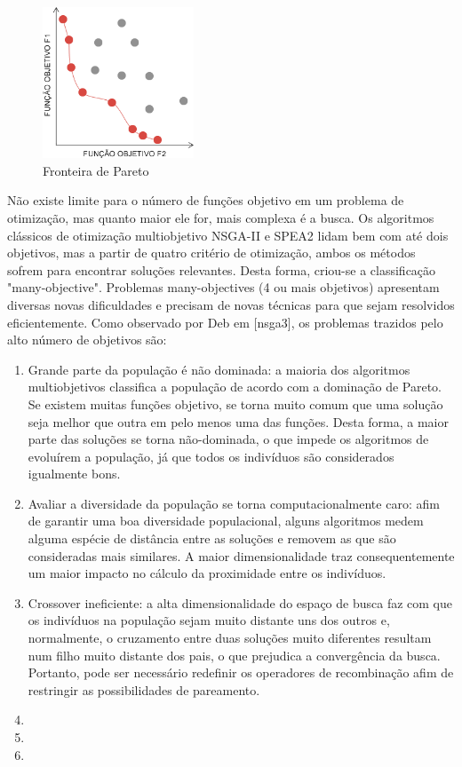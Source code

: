 \begin{figure}
	\label{fig_pareto}
	\caption{Fronteira de Pareto}
	\centering
	\includegraphics[width=0.4\textwidth]{cap_otimizacao-multi/figs/pareto}
\end{figure}

Não existe limite para o número de funções objetivo em um problema de otimização, mas quanto maior ele for, mais complexa é a busca. Os algoritmos clássicos de otimização multiobjetivo NSGA-II e SPEA2 lidam bem com até dois objetivos, mas a partir de quatro critério de otimização, ambos os métodos sofrem para encontrar soluções relevantes. Desta forma, criou-se a classificação "many-objective". Problemas many-objectives (4 ou mais objetivos) apresentam diversas novas dificuldades e precisam de novas técnicas para que sejam resolvidos eficientemente. Como observado por Deb em [nsga3], os problemas trazidos pelo alto número de objetivos são:

\begin{enumerate}  
	\item Grande parte da população é não dominada: a maioria dos algoritmos multiobjetivos classifica a população de acordo com a dominação de Pareto. Se existem muitas funções objetivo, se torna muito comum que uma solução seja melhor que outra em pelo menos uma das funções. Desta forma, a maior parte das soluções se torna não-dominada, o que impede os algoritmos de evoluírem a população, já que todos os indivíduos são considerados igualmente bons.
	\item Avaliar a diversidade da população se torna computacionalmente caro: afim de garantir uma boa diversidade populacional, alguns algoritmos medem alguma espécie de distância entre as soluções e removem as que são consideradas mais similares. A maior dimensionalidade traz consequentemente um maior impacto no cálculo da proximidade entre os indivíduos. 
	\item Crossover ineficiente: a alta dimensionalidade do espaço de busca faz com que os indivíduos na população sejam muito distante uns dos outros e, normalmente, o cruzamento entre duas soluções muito diferentes resultam num filho muito distante dos pais, o que prejudica a convergência da busca. Portanto, pode ser necessário redefinir os operadores de recombinação afim de restringir as possibilidades de pareamento.
	\item 
	\item 
	\item 
\end{enumerate}